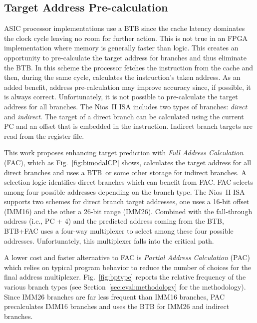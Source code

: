 \subsection{Target Address Pre-calculation}
\label{sec:min:target:addrprecalc}
ASIC processor implementations use a BTB since the cache latency dominates the clock cycle leaving no room for further action. This is not true in an FPGA implementation where memory is generally faster than logic. This creates an opportunity to pre-calculate the target address for branches and thus eliminate the BTB. In this scheme the processor fetches the instruction from the cache and then, during the same cycle, calculates the instruction's taken address. As an added benefit, address pre-calculation may improve accuracy since, if possible, it is always correct. Unfortunately, it is not possible to pre-calculate the target address for all branches. The Nios~II ISA includes two types of branches: \textit{direct} and \textit{indirect}. The target of a direct branch can be calculated using the current PC and an offset that is embedded in the instruction. Indirect branch targets are read from the register file.  

This work proposes enhancing target prediction with \textit{Full Address Calculation} (FAC), which as Fig.~\ref{fig:bimodalCP} shows, calculates the target address for all direct branches and uses a BTB\ or some other storage for indirect branches. A selection logic identifies direct branches which can benefit from FAC. FAC selects among four possible addresses depending on the branch type. The Nios~II ISA supports two schemes for direct branch target addresses, one uses a 16-bit offset (IMM16) and the other a 26-bit range (IMM26). Combined with the fall-through address (i.e., PC + 4) and the predicted address coming from the BTB, BTB+FAC uses a four-way multiplexer to select among these four possible addresses. Unfortunately, this multiplexer falls into the critical path. 

A lower cost and faster alternative to FAC is \textit{Partial Address Calculation} (PAC) which relies on typical program behavior to reduce the number of choices for the final address multiplexer. Fig.~\ref{fig:bptype} reports the relative frequency of the various branch types (see Section~\ref{sec:eval:methodology} for the methodology). Since IMM26 branches are far less frequent than IMM16 branches, PAC precalculates IMM16 branches and uses the BTB for IMM26 and indirect branches.



